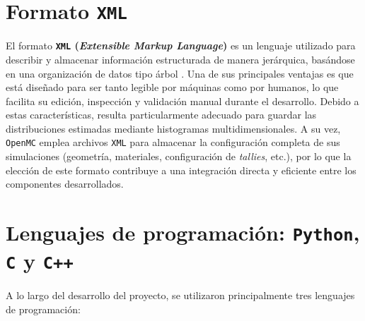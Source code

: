 \section{Formato \texttt{XML}}


El formato \textbf{\texttt{XML} (\textit{Extensible Markup Language})} es un lenguaje utilizado para describir y almacenar información estructurada de manera jerárquica, basándose en una organización de datos tipo árbol \cite{XML2025}. Una de sus principales ventajas es que está diseñado para ser tanto legible por máquinas como por humanos, lo que facilita su edición, inspección y validación manual durante el desarrollo. Debido a estas características, resulta particularmente adecuado para guardar las distribuciones estimadas mediante histogramas multidimensionales. A su vez, \texttt{OpenMC} emplea archivos \texttt{XML} para almacenar la configuración completa de sus simulaciones (geometría, materiales, configuración de \textit{tallies}, etc.), por lo que la elección de este formato contribuye a una integración directa y eficiente entre los componentes desarrollados.

\section{Lenguajes de programación: \texttt{Python}, \texttt{C} y \texttt{C++}}

A lo largo del desarrollo del proyecto, se utilizaron principalmente tres lenguajes de programación:


